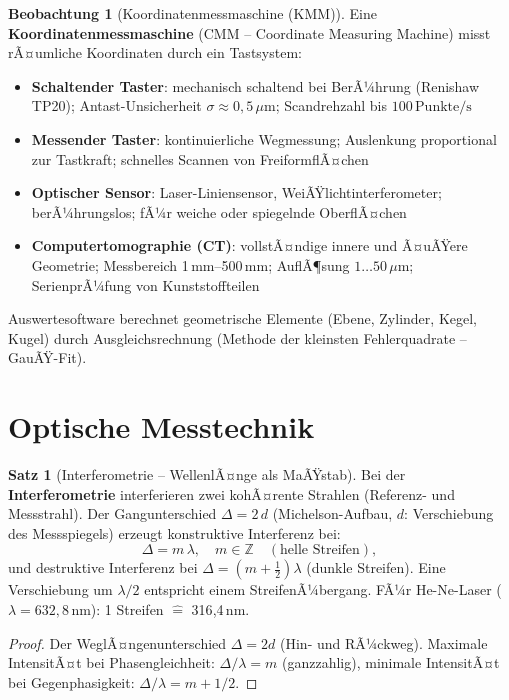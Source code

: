 ﻿\documentclass[a4paper,12pt]{report}
\theoremstyle{definition}
\newtheorem{satz}{Satz}
\newtheorem{beobachtung}{Beobachtung}
\begin{document}
\begin{beobachtung}[Koordinatenmessmaschine (KMM)]
Eine \textbf{Koordinatenmessmaschine} (CMM -- Coordinate Measuring Machine)
misst rÃ¤umliche Koordinaten durch ein Tastsystem:
\begin{itemize}
    \item[-] \textbf{Schaltender Taster}: mechanisch schaltend bei BerÃ¼hrung
          (Renishaw TP20); Antast-Unsicherheit $\sigma \approx 0{,}5\,\mu\mathrm{m}$;
          Scandrehzahl bis $100\,\mathrm{Punkte/s}$
    \item[-] \textbf{Messender Taster}: kontinuierliche Wegmessung; Auslenkung proportional
          zur Tastkraft; schnelles Scannen von FreiformflÃ¤chen
    \item[-] \textbf{Optischer Sensor}: Laser-Liniensensor, WeiÃŸlichtinterferometer;
          berÃ¼hrungslos; fÃ¼r weiche oder spiegelnde OberflÃ¤chen
    \item[-] \textbf{Computertomographie (CT)}: vollstÃ¤ndige innere und Ã¤uÃŸere
          Geometrie; Messbereich 1\,mm--500\,mm; AuflÃ¶sung $1\ldots50\,\mu\mathrm{m}$;
          SerienprÃ¼fung von Kunststoffteilen
\end{itemize}
Auswertesoftware berechnet geometrische Elemente (Ebene, Zylinder, Kegel, Kugel)
durch Ausgleichsrechnung (Methode der kleinsten Fehlerquadrate -- GauÃŸ-Fit).
\end{beobachtung}

\section{Optische Messtechnik}

\begin{satz}[Interferometrie -- WellenlÃ¤nge als MaÃŸstab]
Bei der \textbf{Interferometrie} interferieren zwei kohÃ¤rente Strahlen
(Referenz- und Messstrahl). Der Gangunterschied $\Delta = 2\,d$ (Michelson-Aufbau,
$d$: Verschiebung des Messspiegels) erzeugt konstruktive Interferenz bei:
\[
  \Delta = m\,\lambda, \quad m \in \mathbb{Z} \quad (\text{helle Streifen}),
\]
und destruktive Interferenz bei $\Delta = (m + \tfrac{1}{2})\lambda$ (dunkle Streifen).
Eine Verschiebung um $\lambda/2$ entspricht einem StreifenÃ¼bergang.
FÃ¼r He-Ne-Laser ($\lambda = 632{,}8\,\mathrm{nm}$): 1 Streifen $\hat{=}$ 316{,}4\,nm.
\end{satz}
\begin{proof}
Der WeglÃ¤ngenunterschied $\Delta = 2d$ (Hin- und RÃ¼ckweg).
Maximale IntensitÃ¤t bei Phasengleichheit: $\Delta/\lambda = m$ (ganzzahlig),
minimale IntensitÃ¤t bei Gegenphasigkeit: $\Delta/\lambda = m + 1/2$.
\end{proof}
\end{document}
